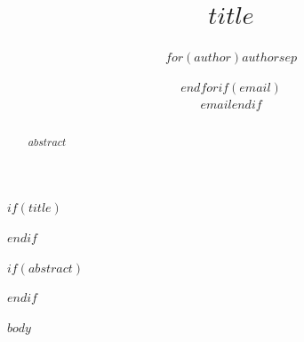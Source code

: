 \documentclass[11pt,a4paper]{article}
\title{$title$}
\author{$for(author)$$author$$sep$ \and $endfor$$if(email)$\\[2pt]\small\texttt{$email$}$endif$}
\date{}
\begin{document}
$if(title)$
\maketitle
$endif$

$if(abstract)$
\begin{abstract}
$abstract$
\end{abstract}
$endif$

$body$
\end{document}
